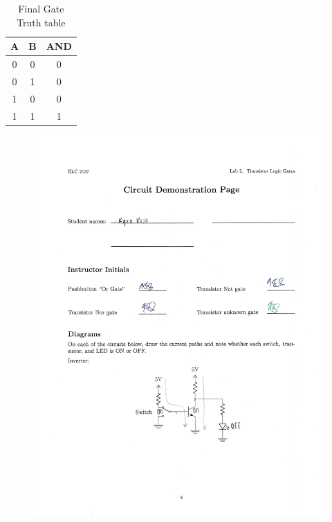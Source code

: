 \documentclass[11pt]{article}
\begin{document}
\begin{table}[h]\centering
	\caption{Final Gate Truth table}
	\begin{tabular}{cc|c}
		\toprule
		A & B & AND \\
		\midrule
		0 & 0 & 0 \\
		0 & 1 & 0 \\
		1 & 0 & 0 \\
		1 & 1 & 1 \\
		\bottomrule
	\end{tabular} 
\end{table}
\begin{figure}[ht]\centering
\includegraphics[width = 5in,trim = 1in 6.5in 0in 4in,clip]{demo page 1}


\end{figure}
\end{document}
